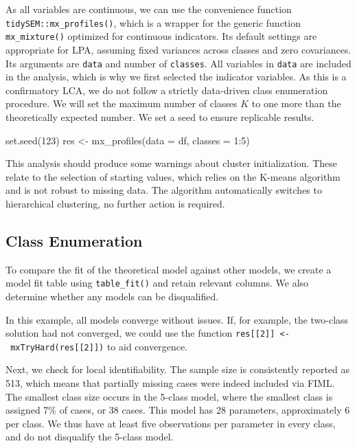 \documentclass[
  man,floatsintext]{apa6}
\newenvironment{Shaded}{\begin{snugshade}}{\end{snugshade}}
\newcommand{\AttributeTok}[1]{\textcolor[rgb]{0.77,0.63,0.00}{#1}}
\newcommand{\DecValTok}[1]{\textcolor[rgb]{0.00,0.00,0.81}{#1}}
\newcommand{\FunctionTok}[1]{\textcolor[rgb]{0.00,0.00,0.00}{#1}}
\newcommand{\NormalTok}[1]{#1}
\newcommand{\OtherTok}[1]{\textcolor[rgb]{0.56,0.35,0.01}{#1}}
\newcommand{\SpecialCharTok}[1]{\textcolor[rgb]{0.00,0.00,0.00}{#1}}
\begin{document}
As all variables are continuous, we can use the convenience function
\texttt{tidySEM::mx\_profiles()},
which is a wrapper for the generic function \texttt{mx\_mixture()} optimized for continuous indicators.
Its default settings are appropriate for LPA, assuming fixed variances across classes and zero covariances.
Its arguments are \texttt{data} and number of \texttt{classes}.
All variables in \texttt{data} are included in the analysis,
which is why we first selected the indicator variables.
As this is a confirmatory LCA,
we do not follow a strictly data-driven class enumeration procedure.
We will set the maximum number of classes \(K\) to one more than the theoretically expected number.
We set a seed to ensure replicable results.

\begin{Shaded}
\begin{Highlighting}[]
\FunctionTok{set.seed}\NormalTok{(}\DecValTok{123}\NormalTok{)}
\NormalTok{res }\OtherTok{\textless{}{-}} \FunctionTok{mx\_profiles}\NormalTok{(}\AttributeTok{data =}\NormalTok{ df, }\AttributeTok{classes =} \DecValTok{1}\SpecialCharTok{:}\DecValTok{5}\NormalTok{)}
\end{Highlighting}
\end{Shaded}

This analysis should produce some warnings about cluster initialization.
These relate to the selection of starting values,
which relies on the K-means algorithm and is not robust to missing data.
The algorithm automatically switches to hierarchical clustering, no further action is required.

\hypertarget{class-enumeration}{%
\subsection{Class Enumeration}\label{class-enumeration}}

To compare the fit of the theoretical model against other models,
we create a model fit table using
\texttt{table\_fit()} and retain relevant columns.
We also determine whether any models can be disqualified.

In this example, all models converge without issues.
If, for example, the two-class solution had not converged, we could use the function \texttt{res{[}{[}2{]}{]}\ \textless{}-\ mxTryHard(res{[}{[}2{]}{]})} to aid convergence.

Next, we check for local identifiability.
The sample size is consistently reported as 513,
which means that partially missing cases were indeed included via FIML.
The smallest class size occurs in the 5-class model,
where the smallest class is assigned 7\% of cases, or 38 cases.
This model has 28 parameters, approximately 6 per class.
We thus have at least five observations per parameter in every class,
and do not disqualify the 5-class model.
\end{document}
